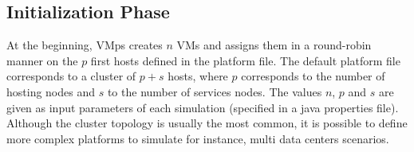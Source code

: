 \documentclass[conference]{IEEEtran}
\newcommand{\vmps}{VMps\xspace}
\begin{document}

\subsection{Initialization Phase}
At the beginning, \vmps creates $n$ VMs and assigns them in a
round-robin manner on the $p$ first hosts defined in the platform file.
The default platform file corresponds to a cluster of $p+s$ hosts,
where $p$ corresponds to the number of hosting nodes and $s$ to the
number of services nodes. The values $n$, $p$ and $s$ are given as input
parameters of each simulation (specified in a java properties file).
 Although the cluster topology is usually the
most common, it is possible to define more complex platforms to simulate for
instance, multi data centers scenarios.
\end{document}

